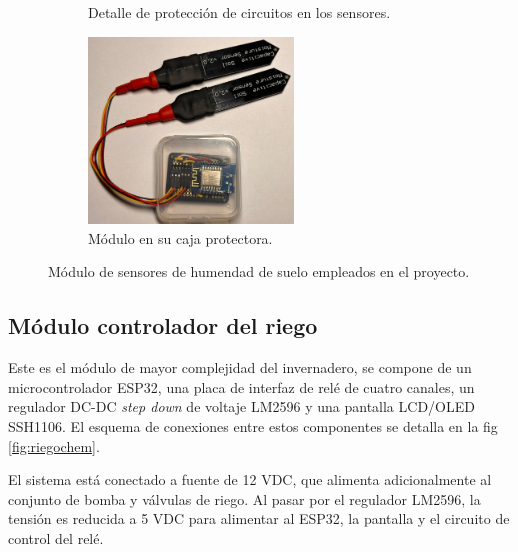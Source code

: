 \begin{figure}[!h]
\begin{subfigure}[b]{0.45\textwidth}
		\caption[Detalle de protección de circuitos en los sensores]{Detalle de protección de circuitos en los sensores.}
		\label{fig:soil3}
     \end{subfigure}	
			\begin{subfigure}[b]{0.45\textwidth}
	\centering
		\includegraphics[width=0.60\textwidth]{./Figures/soil3.jpg}
		\caption[Módulo en su caja protectora]{Módulo en su caja protectora.}
		\label{fig:soil4}
     \end{subfigure}
     \hfill
        \caption[Módulos de sensores de humendad de suelo  empleados en el proyecto]{Módulo de sensores de humendad de suelo  empleados en el proyecto.}
        \label{fig:soilsenors}
\end{figure}


\pagebreak

\subsection{Módulo controlador del riego}
\label{Módulo controlador del riego}

Este es el módulo de mayor complejidad del invernadero, se compone de un microcontrolador ESP32, una placa de interfaz de relé de cuatro canales, un regulador DC-DC \textit{step down} de voltaje LM2596 y una pantalla LCD/OLED SSH1106. El esquema de conexiones entre estos componentes se detalla en la fig \ref{fig:riegochem}.

El sistema está conectado a fuente de 12 VDC, que alimenta adicionalmente al conjunto de bomba y válvulas de riego. Al pasar por el regulador LM2596, la tensión es reducida a 5 VDC para alimentar al ESP32, la pantalla y el circuito de control del relé.

